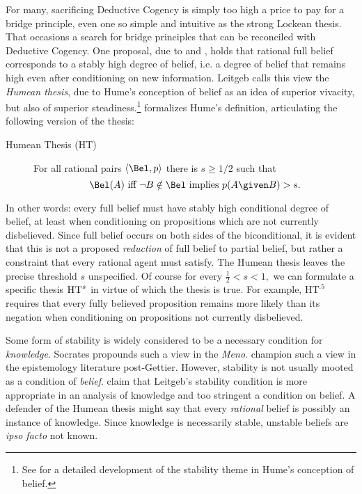 For many, sacrificing Deductive Cogency is simply too high a price to pay for a
bridge principle, even one so simple and intuitive as the strong Lockean thesis.
That occasions a search for bridge principles that can be reconciled with
Deductive Cogency. One proposal, due to
\citet{leitgeb2013reducing,leitgeb2014stability,leitgeb2015humean,leitgeb2017stability}
and \citet{arlo2012belief}, holds that rational full belief corresponds to a
stably high degree of belief, i.e. a degree of belief that remains high even
after conditioning on new information. Leitgeb calls this view the {\em Humean
thesis}, due to Hume's conception of belief as an idea of superior vivacity, but
also of superior steadiness.\footnote{See \citet{loeb2002stability,
loeb2010reflection} for a detailed development of the stability theme in Hume's
conception of belief.} \citet{leitgeb2017stability} formalizes Hume's
definition, articulating the following version of the thesis:
\begin{description}
\item[Humean Thesis (HT)] For all rational pairs  $\langle \Bel, p \rangle$
there is $s\geq 1/2$ such that $$\Bel(A) \text{ iff } \neg B \notin \Bel \text{
implies } p(A \given B)> s.$$
\end{description}
In other words: every full belief must have stably high conditional degree of
belief, at least when conditioning on propositions which are not currently
disbelieved. Since full belief occurs on both sides of the biconditional, it is
evident that this is not a proposed {\em reduction} of full belief to partial
belief, but rather a constraint that every rational agent must satisfy. The
Humean thesis leaves the precise threshold $s$ unspecified. Of course for every
$\frac{1}{2}< s<1,$ we can formulate a specific thesis $\textsc{HT}^s$ in virtue
of which the thesis is true. For example, $\text{HT}^{.5}$ requires that every
fully believed proposition remains more likely than its negation when
conditioning on propositions not currently disbelieved.

Some form of stability is widely considered to be a necessary condition for {\em
knowledge}. Socrates propounds such a view in the {\em Meno}.
\citet{paxson1969knowledge} champion such a view in the epistemology literature
post-Gettier. However, stability is not usually mooted as a condition of {\em
belief}. \citet{raidl2017bridging} claim that Leitgeb's stability condition is
more appropriate in an analysis of knowledge and too stringent a condition on
belief. A defender of the Humean thesis might say that every {\em rational}
belief is possibly an instance of knowledge. Since knowledge is necessarily
stable, unstable beliefs are {\em ipso facto} not known.


